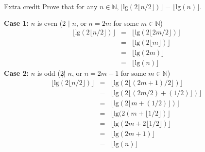 \documentclass[11pt]{article}
\newcommand{\tlg}{\text{lg}}
\begin{document}
\begin{prob}{Extra credit}
Prove that for any $n \in \mathbb{N}, \lfloor\tlg(2\lfloor n/2 \rfloor) \rfloor = \lfloor \tlg (n) \rfloor$.
\end{prob}
\begin{sol}

\textbf{Case 1:} $n$ is even ($2$ $|$ $n$, or $n = 2m$ for some $m \in \mathbb{N}$)
\begin{eqnarray*}
\lfloor \tlg (2\lfloor n/2 \rfloor) \rfloor & = & \lfloor \tlg (2\lfloor 2m/2 \rfloor) \rfloor \\
& = & \lfloor \tlg (2\lfloor m \rfloor) \rfloor \\
& = & \lfloor \tlg (2m) \rfloor \\
& = & \lfloor \tlg (n) \rfloor
\end{eqnarray*}
\textbf{Case 2:} $n$ is odd ($2 \not| $  $n$, or $n = 2m + 1$ for some $m \in \mathbb{N}$)
\begin{eqnarray*}
\lfloor \tlg (2\lfloor n/2 \rfloor) \rfloor & = & \lfloor \tlg (2\lfloor (2m + 1)/2 \rfloor) \rfloor \\
& = & \lfloor \tlg (2\lfloor (2m/2) + (1/2) \rfloor) \rfloor \\
& = & \lfloor \tlg (2\lfloor m + (1/2) \rfloor) \rfloor \\
& = & \lfloor \tlg (2(m + \lfloor 1/2 \rfloor) \rfloor \\
& = & \lfloor \tlg (2m + 2\lfloor 1/2 \rfloor ) \rfloor \\
& = & \lfloor \tlg (2m + 1) \rfloor \\
& = & \lfloor \tlg (n) \rfloor
\end{eqnarray*}
\end{sol}
\end{document}
